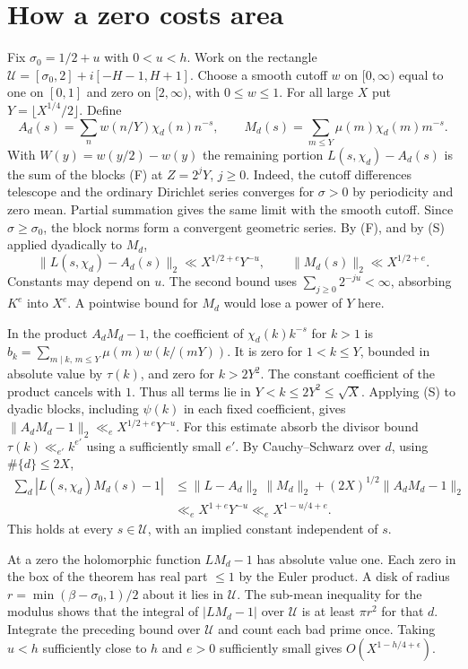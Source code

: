 \documentclass[11pt]{article}
\begin{document}
\newpage
\section{How a zero costs area}\label{sec:disk}
Fix $\sigma_0=1/2+u$ with $0<u<h$. Work on the rectangle $\mathcal U=[\sigma_0,2]+i[-H-1,H+1]$. Choose a smooth cutoff $w$ on $[0,\infty)$ equal to one on $[0,1]$ and zero on $[2,\infty)$, with $0\le w\le1$. For all large $X$ put $Y=\lfloor X^{1/4}/2\rfloor$. Define
\[
 A_d(s)=\sum_n w(n/Y)\chi_d(n)n^{-s},\qquad
 M_d(s)=\sum_{m\le Y}\mu(m)\chi_d(m)m^{-s}.
\]
With $W(y)=w(y/2)-w(y)$ the remaining portion $L(s,\chi_d)-A_d(s)$ is the sum of the blocks (F) at $Z=2^jY$, $j\ge0$. Indeed, the cutoff differences telescope and the ordinary Dirichlet series converges for $\sigma>0$ by periodicity and zero mean. Partial summation gives the same limit with the smooth cutoff. Since $\sigma\ge\sigma_0$, the block norms form a convergent geometric series. By (F), and by (S) applied dyadically to $M_d$,
\[
 \|L(s,\chi_d)-A_d(s)\|_2\ll X^{1/2+e}Y^{-u},\qquad
 \|M_d(s)\|_2\ll X^{1/2+e}.
\]
Constants may depend on $u$. The second bound uses $\sum_{j\ge0}2^{-ju}<\infty$, absorbing $K^e$ into $X^e$. A pointwise bound for $M_d$ would lose a power of $Y$ here.

In the product $A_d M_d-1$, the coefficient of $\chi_d(k)k^{-s}$ for $k>1$ is $b_k=\sum_{m\mid k,\,m\le Y}\mu(m)w(k/(mY))$. It is zero for $1<k\le Y$, bounded in absolute value by $\tau(k)$, and zero for $k>2Y^2$. The constant coefficient of the product cancels with $1$. Thus all terms lie in $Y<k\le 2Y^2\le\sqrt X$. Applying (S) to dyadic blocks, including $\psi(k)$ in each fixed coefficient, gives $\|A_dM_d-1\|_2\ll_e X^{1/2+e}Y^{-u}$. For this estimate absorb the divisor bound $\tau(k)\ll_{e'} k^{e'}$ using a sufficiently small $e'$. By Cauchy--Schwarz over $d$, using $\#\{d\}\le2X$,
\begin{align*}
 \sum_d |L(s,\chi_d)M_d(s)-1|
 &\le \|L-A_d\|_2\,\|M_d\|_2+(2X)^{1/2}\|A_dM_d-1\|_2\\
 &\ll_e X^{1+e}Y^{-u}\ll_e X^{1-u/4+e}.
\end{align*}
This holds at every $s\in\mathcal U$, with an implied constant independent of $s$.

At a zero the holomorphic function $LM_d-1$ has absolute value one. Each zero in the box of the theorem has real part $\le1$ by the Euler product. A disk of radius $r=\min(\beta-\sigma_0,1)/2$ about it lies in $\mathcal U$. The sub-mean inequality for the modulus shows that the integral of $|LM_d-1|$ over $\mathcal U$ is at least $\pi r^2$ for that $d$. Integrate the preceding bound over $\mathcal U$ and count each bad prime once. Taking $u<h$ sufficiently close to $h$ and $e>0$ sufficiently small gives $O(X^{1-h/4+\epsilon})$.
\end{document}
